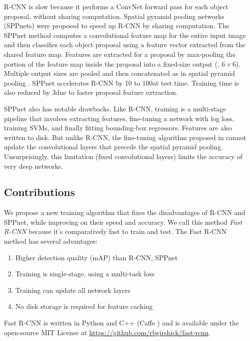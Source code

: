 R-CNN is slow because it performs a ConvNet forward pass for each object proposal, without sharing computation.
Spatial pyramid pooling networks (SPPnets) \cite{he2014spp} were proposed to speed up R-CNN by sharing computation.
The SPPnet method computes a convolutional feature map for the entire input image and then classifies each object proposal using a feature vector extracted from the shared feature map.
Features are extracted for a proposal by max-pooling the portion of the feature map inside the proposal into a fixed-size output (\eg, $6 \times 6$).
Multiple output sizes are pooled and then concatenated as in spatial pyramid pooling \cite{Lazebnik2006}.
SPPnet accelerates R-CNN by 10 to 100\X at test time.
Training time is also reduced by 3\X due to faster proposal feature extraction.

SPPnet also has notable drawbacks.
Like R-CNN, training is a multi-stage pipeline that involves extracting features, fine-tuning a network with log loss, training SVMs, and finally fitting bounding-box regressors.
Features are also written to disk.
But unlike R-CNN, the fine-tuning algorithm proposed in \cite{he2014spp} cannot update the convolutional layers that precede the spatial pyramid pooling.
Unsurprisingly, this limitation (fixed convolutional layers) limits the accuracy of very deep networks.

\subsection{Contributions}
We propose a new training algorithm that fixes the disadvantages of R-CNN and SPPnet, while improving on their speed and accuracy.
We call this method \emph{Fast R-CNN} because it's comparatively fast to train and test.
The Fast R-CNN method has several advantages:
\begin{enumerate}
  \itemsep0em
  \item Higher detection quality (mAP) than R-CNN, SPPnet
  \item Training is single-stage, using a multi-task loss
  \item Training can update all network layers
  \item No disk storage is required for feature caching
\end{enumerate}

Fast R-CNN is written in Python and C++ (Caffe \cite{jia2014caffe}) and is available under the open-source MIT License at \url{https://github.com/rbgirshick/fast-rcnn}.
